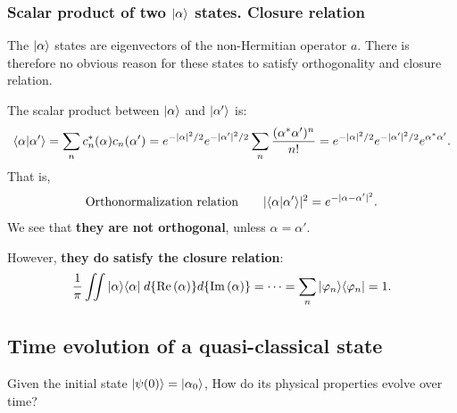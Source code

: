 \subsubsection{Scalar product of two $|\alpha\rangle$ states. Closure relation}
The $|\alpha\rangle$ states are eigenvectors of the non-Hermitian operator $a$. There is therefore no obvious reason for these states to satisfy orthogonality 
and closure relation.

The scalar product between $|\alpha\rangle$ and $|\alpha'\rangle$ is:
\begin{align*}
    \langle\alpha|\alpha'\rangle=\sum_n c_n^*(\alpha)c_n(\alpha')=e^{-|\alpha|^2/2}e^{-|\alpha'|^2/2}\sum_n\frac{(\alpha^*\alpha')^n}{n!}=e^{-|\alpha|^2/2}e^{-|\alpha'|^2/2}e^{\alpha^*\alpha'}.
\end{align*}
That is,
\begin{align}
    \text{Orthonormalization relation}\qquad|\langle\alpha|\alpha'\rangle|^2=e^{-|\alpha-\alpha'|^2}.
\end{align}
We see that \textbf{they are not orthogonal}, unless $\alpha=\alpha'$.

However, \textbf{they do satisfy the closure relation}:
\begin{align*}
    \frac{1}{\pi}\iint|\alpha\rangle\langle\alpha|\;d\{\text{Re}\left(\alpha\right)\}d\{\text{Im}\left(\alpha\right)\}=\cdots=\sum_n|\varphi_n\rangle\langle\varphi_n|=1.
\end{align*}

\subsection{Time evolution of a quasi-classical state}
Given the initial state $|\psi(0)\rangle=|\alpha_0\rangle$, How do its physical properties evolve over time? 
%
